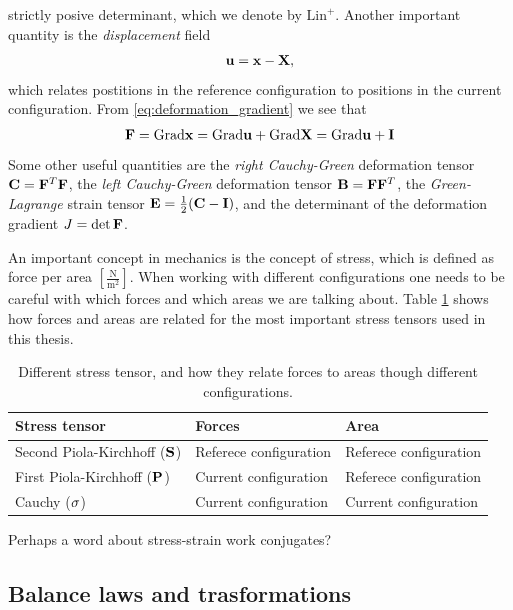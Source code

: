 strictly posive determinant, which we denote by
$\mathrm{Lin}^+$. Another important quantity is the
\emph{displacement} field  
\begin{align}
  \mathbf{u} = \mathbf{x}-\mathbf{X}, 
  \label{eq:displacement}
\end{align}
which relates postitions in the reference configuration to positions
in the current configuration. From \eqref{eq:deformation_gradient} we
see that
\begin{align}
  \mathbf{F} = \mathrm{Grad} \mathbf{x} = \mathrm{Grad} \mathbf{u} + \mathrm{Grad} \mathbf{X} = \mathrm{Grad} \mathbf{u} + \mathbf{I}
\end{align}
Some other useful quantities are the \emph{right Cauchy-Green} deformation
tensor $\mathbf{C} = \mathbf{F}^T\mathbf{F}$, the \emph{left Cauchy-Green} deformation tensor
$\mathbf{B} = \mathbf{F}\mathbf{F}^T$, the \emph{Green-Lagrange} strain tensor
$\mathbf{E} = \frac{1}{2}(\mathbf{C} - \mathbf{I})$, and the determinant of the
deformation gradient $J = \det \mathbf{F}$.

An important concept in mechanics is the concept of stress, which is
defined as force per area
$\left[\frac{\mathrm{N}}{\mathrm{m}^2}\right]$. When working with
different configurations one needs to be careful with which forces and
which areas we are talking about. Table \ref{tab:stress_tensor}
shows how forces and areas are related for the most important stress
tensors used in this thesis.  

\begin{table}[h]
  \centering
  \begin{tabular}{lll}
    \toprule
    Stress tensor & Forces & Area \\
    \midrule
    Second Piola-Kirchhoff ($\mathbf{S}$) & Referece configuration & Referece configuration \\
    First Piola-Kirchhoff ($\mathbf{P}$) & Current configuration  &  Referece configuration \\
    Cauchy ($\mathbf{\sigma}$) &  Current configuration & Current configuration  \\
    \bottomrule
  \end{tabular}
  \caption{\label{tab:stress_tensor}Different stress tensor, and how
    they relate forces to areas though different configurations.}
\end{table}


Perhaps a word about stress-strain work conjugates?

\subsection{Balance laws and trasformations}


